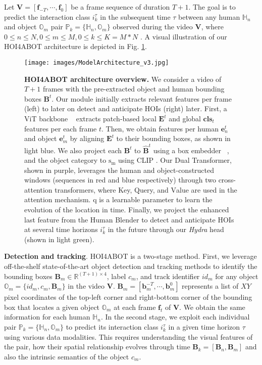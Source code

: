 \documentclass{article}
\begin{document}
Let $\mathbf{V}=[\mathbf{f}_{-T},\cdots,\mathbf{f}_{0}]$ be a frame sequence of duration $T+1$. The goal is to predict the interaction class $i_k^{\tau}$ in the subsequent time $\tau$ between any human $\mathbb{H}_n$ and object $\mathbb{O}_m$ pair $\mathbb{P}_k=\{ \mathbb{H}_n,\mathbb{O}_m \}$ observed during the video $\mathbf{V}$, where $0\leq n \leq N, 0\leq m \leq M, 0 \leq k \leq K=M*N$ .  A visual illustration of our HOI4ABOT architecture is depicted in Fig. \ref{fig:model_architecture}.

\begin{figure}
    \centering
    \texttt{[image: images/ModelArchitecture\_v3.jpg]}
    \caption{\textbf{HOI4ABOT architecture overview.} We consider a video of $T+1$ frames with the pre-extracted object and human bounding boxes $\mathbf{B}^t$. Our module initially extracts relevant features per frame (left) to later on detect and anticipate HOIs (right) later. First, a ViT backbone ~\citep{oquab2023dinov2} extracts patch-based local $\mathbf{E}^t$ and global $\mathbf{cls}_t$ features per each frame $t$. Then, we obtain features per human $\mathbf{e}_n^t$ and object $\mathbf{e}_m^t$ by aligning $\mathbf{E}^t$ to their bounding boxes, as shown in light blue. We also project each $\mathbf{B}^t$ to $\hat{\mathbf{B}}^t$ using a box embedder ~\citep{posembed_fourier}, and the object category to $\mathrm{s_m}$ using CLIP \citep{clip}. Our Dual Transformer, shown in purple, leverages the human and object-constructed windows (sequences in red and blue respectively) through two cross-attention transformers, where $\mathrm{K}$ey, $\mathrm{Q}$uery, and $\mathrm{V}$alue are used in the attention mechanism. $\mathrm{q}$ is a learnable parameter to learn the evolution of the location in time. Finally, we project the enhanced last feature from the Human Blender to detect and anticipate HOIs at several time horizons $i_k^{\tau}$ in the future through our \textit{Hydra} head (shown in light green).}
    \vspace{-5mm}
    \label{fig:model_architecture}
\end{figure}


\textbf{Detection and tracking}. HOI4ABOT is a two-stage method. First, we leverage off-the-shelf state-of-the-art object detection and tracking methods to identify the bounding boxes $\mathbf{B}_m \in \mathbb{R}^{(T+1) \times 4}$, label $c_m$, and track identifier $id_m$ for any object $\mathbb{O}_m= \{id_m, c_m, \mathbf{B}_m\}$ in the video $\mathbf{V}$. $\mathbf{B}_m=[\mathbf{b}_m^{-T},\cdots,\mathbf{b}_m^{0}]$ represents a list of $XY$ pixel coordinates of the top-left corner and right-bottom corner of the bounding box that locates a given object $\mathbb{O}_m$ at each frame $\mathbf{f}_{t}$ of $\mathbf{V}$. We obtain the same information for each human $\mathbb{H}_n$.   In the second stage, we exploit each individual pair $\mathbb{P}_k=\{ \mathbb{H}_n,\mathbb{O}_m \}$ to predict its interaction class $i_k^{\tau}$ in a given time horizon $\tau$ using various data modalities. This requires understanding the visual features of the pair, how their spatial relationship evolves through time $\mathbf{B}_k = [\mathbf{B}_n,\mathbf{B}_m ]$ and also the intrinsic semantics of the object $c_m$.
\end{document}
